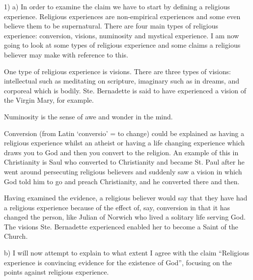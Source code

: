 \documentclass[a4 paper]{article}
\begin{document}
1)
a) In order to examine the claim we have to start by defining a religious experience.  Religious experiences are non-empirical experiences and some even believe them to be supernatural.  There are four main types of religious experience: conversion, visions, numinosity and mystical experience.  I am now going to look at some types of religious experience and some claims a religious believer may make with reference to this.

One type of religious experience is visions.  There are three types of visions: intellectual such as meditating on scripture, imaginary such as in dreams, and corporeal which is bodily.  Ste. Bernadette is said to have experienced a vision of the Virgin Mary, for example.

Numinosity is the sense of awe and wonder in the mind.

Conversion (from Latin `conversio' = to change) could be explained as having a religious experience whilst an atheist or having a life changing experience which draws you to God and then you convert to the religion.  An example of this in Christianity is Saul who converted to Christianity and became St. Paul after he went around persecuting religious believers and suddenly saw a vision in which God told him to go and preach Christianity, and he converted there and then.

Having examined the evidence, a religious believer would say that they have had a religious experience because of the effect of, say, conversion in that it has changed the person, like Julian of Norwich who lived a solitary life serving God.  The visions Ste. Bernadette experienced enabled her to become a Saint of the Church.

b) I will now attempt to explain to what extent I agree with the claim ``Religious experience is convincing evidence for the existence of God'', focusing on the points against religious experience.
\end{document}
